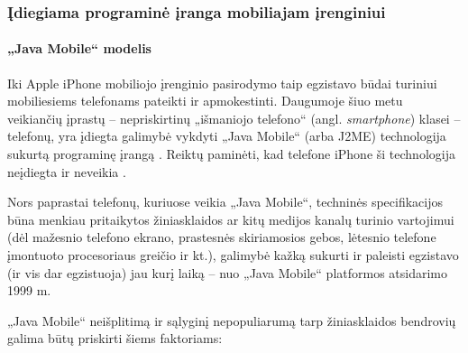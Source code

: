 \documentclass[kursinis-darbas]{vukf}
\begin{document}
\subsubsection{Įdiegiama programinė įranga mobiliajam įrenginiui}

\paragraph{„Java Mobile“ modelis}

Iki Apple iPhone mobiliojo įrenginio pasirodymo taip egzistavo būdai turiniui mobiliesiems telefonams pateikti ir apmokestinti. Daugumoje šiuo metu veikiančių įprastų – nepriskirtinų „išmaniojo telefono“ (angl. \emph{smartphone}) klasei – telefonų, yra įdiegta galimybė vykdyti „Java Mobile“ (arba J2ME) technologija sukurtą programinę įrangą \cite{java_com_learn_about_java_technology}. Reiktų paminėti, kad telefone iPhone ši technologija neįdiegta ir neveikia \cite{apple_com_iphone_technical_specifications}.

Nors paprastai telefonų, kuriuose veikia „Java Mobile“, techninės specifikacijos būna menkiau pritaikytos žiniasklaidos ar kitų medijos kanalų turinio vartojimui (dėl mažesnio telefono ekrano, prastesnės skiriamosios gebos, lėtesnio telefone įmontuoto procesoriaus greičio ir kt.), galimybė kažką sukurti ir paleisti egzistavo (ir vis dar egzistuoja) jau kurį laiką – nuo „Java Mobile“ platformos atsidarimo 1999 m. \cite{sun_com_j2me_technology_turns_5}

„Java Mobile“ neišplitimą ir sąlyginį nepopuliarumą tarp žiniasklaidos bendrovių galima būtų priskirti šiems faktoriams:
\end{document}
